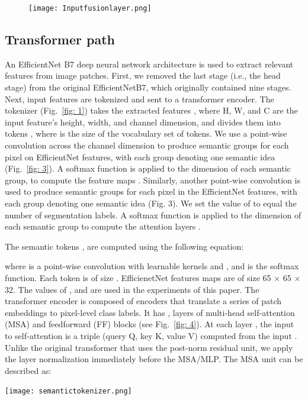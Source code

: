 \documentclass[journal]{IEEEtran}
\begin{document}
\begin{figure}  
\centering
\texttt{[image: Inputfusionlayer.png]}
\label{fig: 2}
\end{figure}



\subsection{Transformer path}
An EfficientNet B7 \cite{pmlr-v97-tan19a} deep neural network architecture is used to extract relevant features from image patches. First, we removed the last stage (i.e., the head stage) from the original EfficientNetB7, which originally contained nine stages. 
Next, input features are tokenized and sent to a transformer encoder. The tokenizer (Fig.~\ref{fig: 1}) takes the extracted features , where H, W, and C are the input feature’s height, width, and channel dimension, and divides them into tokens , where  is the size of the vocabulary set of tokens.
We use a point-wise convolution across the channel dimension to produce  semantic groups for each pixel on EfficientNet features, with each group denoting one semantic idea (Fig.~\ref{fig: 3}). A softmax function is applied to the  dimension of each semantic group, to compute the feature maps . Similarly, another point-wise convolution is used to produce  semantic groups for each pixel in the EfficientNet features, with each group denoting one semantic idea (Fig. 3). We set the value of  to equal the number of segmentation labels. A softmax function is applied to the  dimension of each semantic group to compute the attention layers .

The semantic tokens ,  are computed using the following equation:

where  is a point-wise convolution with learnable kernels   and  , and  is the softmax function. Each token  is of size .  EfficienetNet features maps are of size 65 × 65 × 32. The values of , and  are used in the experiments of this paper. 
The transformer encoder \cite{https://doi.org/10.48550/arxiv.2010.11929} is composed of encoders that translate a series of patch embeddings to pixel-level class labels. It has , layers of multi-head self-attention (MSA) and feedforward (FF) blocks (see Fig.~\ref{fig: 4}). At each layer  , the input to self-attention is a triple (query Q, key K, value V) computed from the input . Unlike the original transformer that uses the post-norm residual unit, we apply the layer normalization immediately before the MSA/MLP. The MSA unit can be described as: 
\begin{figure*}[]
\centering
    \texttt{[image: semantictokenizer.png]}\
\caption{The semantic tokenizer. A point-wise convolution across the channel dimension extracts feature maps  and attention layers A}
\label{fig: 3}
\end{figure*}
\end{document}
